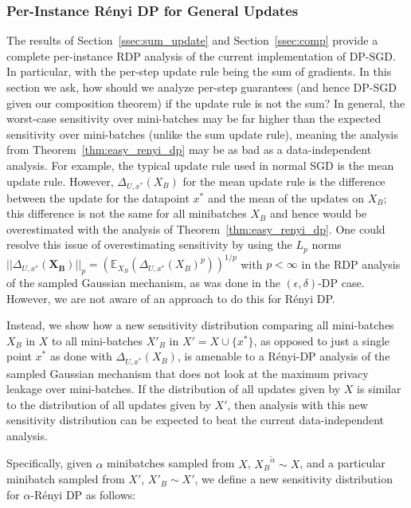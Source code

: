 \subsubsection{Per-Instance R\'enyi DP for General Updates}



The results of Section~\ref{ssec:sum_update} and Section~\ref{ssec:comp} provide a complete per-instance RDP analysis of the current implementation of DP-SGD. In particular, with the per-step update rule being the sum of gradients. In this section we ask, how should we analyze per-step guarantees (and hence DP-SGD given our composition theorem) if the update rule is not the sum? In general, the worst-case sensitivity over mini-batches may be far higher than the expected sensitivity over mini-batches (unlike the sum update rule), meaning the analysis from Theorem~\ref{thm:easy_renyi_dp} may be as bad as a data-independent analysis. For example, the typical update rule used in normal SGD is the mean update rule. However, $\Delta_{U,x^*}(X_B)$ for the mean update rule is the difference between the update for the datapoint $x^*$ and the mean of the updates on $X_B$; this difference is not the same for all minibatches $X_B$ and hence would be overestimated with the analysis of Theorem~\ref{thm:easy_renyi_dp}. One could resolve this issue of overestimating sensitivity by using the $L_p$ norms $||\Delta_{U,x^*}(\mathbf{X_B})||_{p} = (\mathbb{E}_{X_B} (\Delta_{U,x^*}(X_B)^p))^{1/p}$ with $p < \infty$ in the RDP analysis of the sampled Gaussian mechanism, as was done in the $(\epsilon,\delta)$-DP case. %
However, we are not aware of an approach to do this for R\'enyi DP.




Instead, we show how a new sensitivity distribution comparing all mini-batches $X_B$ in $X$ to all mini-batches $X'_B$ in $X' = X \cup \{x^*\}$, as opposed to just a single point $x^*$ as done with $\Delta_{U,x^*}(X_B)$, is amenable to a R\'enyi-DP analysis of the sampled Gaussian mechanism that does not look at the maximum privacy leakage over mini-batches. %
If the distribution of all updates given by $X$ is similar to the distribution of all updates given by $X'$, then analysis with this new sensitivity distribution can be expected to beat the current data-independent analysis.


Specifically, given $\alpha$ minibatches sampled from $X$, ${X_{B}}^{\tilde \alpha} \sim X$, and a particular minibatch sampled from $X'$, $X'_B \sim X'$, we define a new sensitivity distribution for $\alpha$-R\'enyi DP as follows: 

